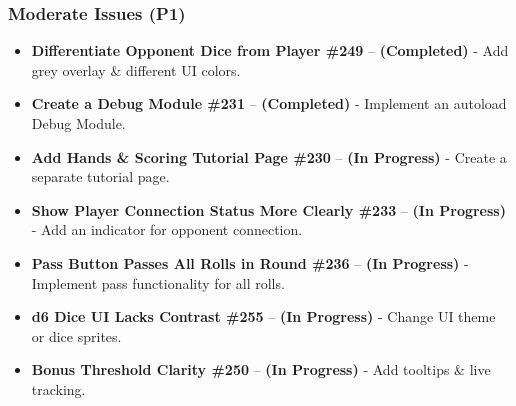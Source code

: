 \documentclass[12pt, titlepage]{article}
\begin{document}
\subsubsection{Moderate Issues (P1)}
\begin{itemize}
    \item \textbf{Differentiate Opponent Dice from Player \#249} – \textbf{(Completed)} - Add grey overlay \& different UI colors.
    \item \textbf{Create a Debug Module \#231} – \textbf{(Completed)} - Implement an autoload Debug Module.
    \item \textbf{Add Hands \& Scoring Tutorial Page \#230} – \textbf{(In Progress)} - Create a separate tutorial page.
    \item \textbf{Show Player Connection Status More Clearly \#233} – \textbf{(In Progress)} - Add an indicator for opponent connection.
    \item \textbf{Pass Button Passes All Rolls in Round \#236} – \textbf{(In Progress)} - Implement pass functionality for all rolls.
    \item \textbf{d6 Dice UI Lacks Contrast \#255} – \textbf{(In Progress)} - Change UI theme or dice sprites.
    \item \textbf{Bonus Threshold Clarity \#250} – \textbf{(In Progress)} - Add tooltips \& live tracking.
\end{itemize}
\end{document}
